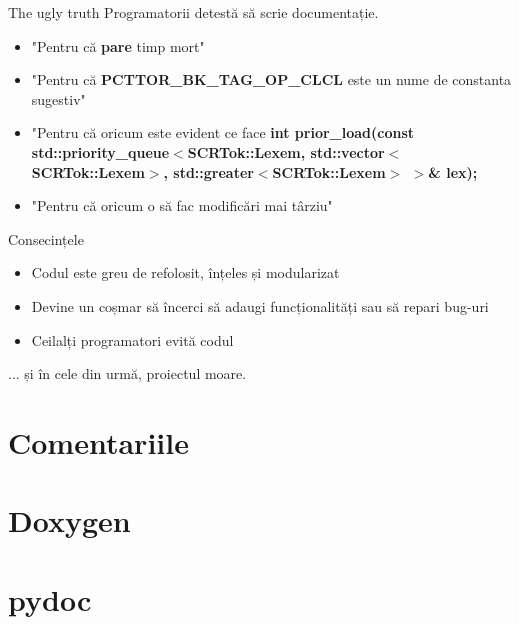 \documentclass{beamer}
\begin{document}
\begin{frame}{The ugly truth}
	Programatorii detestă să scrie documentație.
	\pause
	\begin{itemize}
		\item "Pentru că {\bf pare} timp mort"
		\pause
		\item "Pentru că {\bf PCTTOR\_BK\_TAG\_OP\_CLCL} este un nume de constanta sugestiv"
		\pause
		\item "Pentru că oricum este evident ce face {\bf int prior\_load(const std::priority\_queue$<$SCRTok::Lexem, std::vector$<$SCRTok::Lexem$>$, std::greater$<$SCRTok::Lexem$>$ $>$\& lex);}
		\pause
		\item "Pentru că oricum o să fac modificări mai târziu"
		\pause
	\end{itemize}
\end{frame}

\begin{frame}{Consecințele}
  \begin{itemize}
  \pause
  \item Codul este greu de refolosit, înțeles și modularizat
  \pause
  \item Devine un coșmar să încerci să adaugi funcționalități sau să repari bug-uri
  \pause
  \item Ceilalți programatori evită codul
  \end{itemize}
  \pause
  ... și în cele din urmă, proiectul moare.
\end{frame}

\section{Comentariile}

\section{Doxygen}

\section{pydoc}
\end{document}
